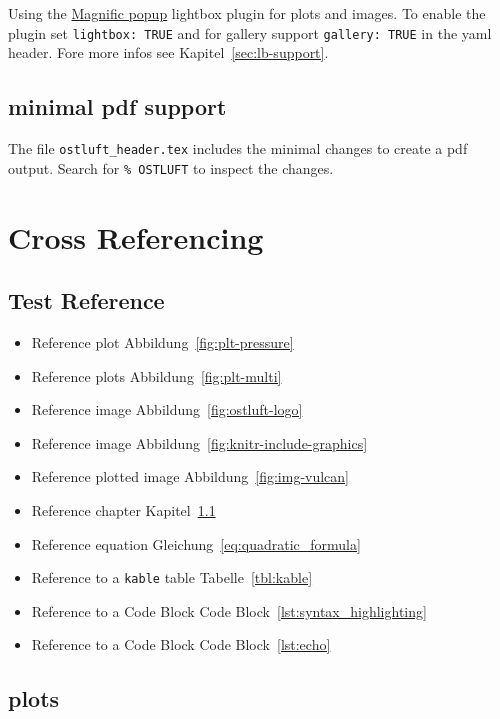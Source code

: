 \documentclass[
]{article}
\providecommand{\tightlist}{%
  \setlength{\itemsep}{0pt}\setlength{\parskip}{0pt}}
\begin{document}
Using the \href{http://dimsemenov.com/plugins/magnific-popup/}{Magnific
popup} lightbox plugin for plots and images. To enable the plugin set
\texttt{lightbox:\ TRUE} and for gallery support \texttt{gallery:\ TRUE}
in the yaml header. Fore more infos see Kapitel~\ref{sec:lb-support}.

\hypertarget{minimal-pdf-support}{%
\subsection{minimal pdf support}\label{minimal-pdf-support}}

The file \texttt{ostluft\_header.tex} includes the minimal changes to
create a pdf output. Search for \texttt{\%\ OSTLUFT} to inspect the
changes.

\hypertarget{sec:crossref}{%
\section{Cross Referencing}\label{sec:crossref}}

\hypertarget{sec:test}{%
\subsection{Test Reference}\label{sec:test}}

\begin{itemize}
\tightlist
\item
  Reference plot Abbildung~\ref{fig:plt-pressure}
\item
  Reference plots Abbildung~\ref{fig:plt-multi}
\item
  Reference image Abbildung~\ref{fig:ostluft-logo}
\item
  Reference image Abbildung~\ref{fig:knitr-include-graphics}
\item
  Reference plotted image Abbildung~\ref{fig:img-vulcan}
\item
  Reference chapter Kapitel~\ref{sec:test}
\item
  Reference equation Gleichung~\ref{eq:quadratic_formula}
\item
  Reference to a \texttt{kable} table Tabelle~\ref{tbl:kable}
\item
  Reference to a Code Block Code Block~\ref{lst:syntax_highlighting}
\item
  Reference to a Code Block Code Block~\ref{lst:echo}
\end{itemize}

\hypertarget{plots}{%
\subsection{plots}\label{plots}}
\end{document}
